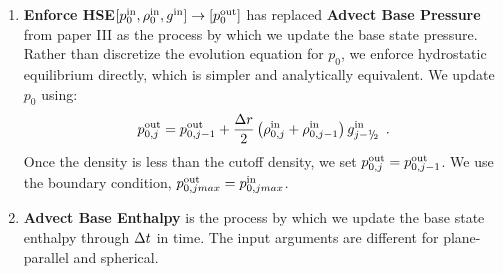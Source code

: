 \begin{enumerate}
\item {\bf Enforce HSE}$[p_0^{\mathrm{in}},\rho_0^{\mathrm{in}},g^{\mathrm{in}}] \rightarrow [p_0^{\mathrm{out}}]$
has replaced {\bf Advect Base Pressure} from paper III as the process by which we 
update the base state pressure.  Rather than discretize the evolution equation
for $p_0$, we enforce hydrostatic equilibrium directly, which is simpler and
analytically equivalent.  We update $p_0$ using:
\begin{equation}
p_{0,j}^{\outp} = p_{0,j-1}^{\outp} + 
\frac{\Delta r}{2}\left(\rho_{0,j}^{\inp}+\rho_{0,j-1}^{\inp}\right)g_{j-\myhalf}^{\inp}\enskip .
\end{equation}
Once the density is less than the cutoff density, we set $p_{0,j}^{\mathrm{out}} = p_{0,j-1}^{\mathrm{out}}$.
We use the boundary condition, $p_{0,jmax}^{\mathrm{out}} = p_{0,jmax}^{\mathrm{in}}$.

\item {\bf Advect Base Enthalpy}
is the process by which we update the base state enthalpy through $\Delta t$ in time.
The input arguments are different for plane-parallel and spherical.
\end{enumerate}
